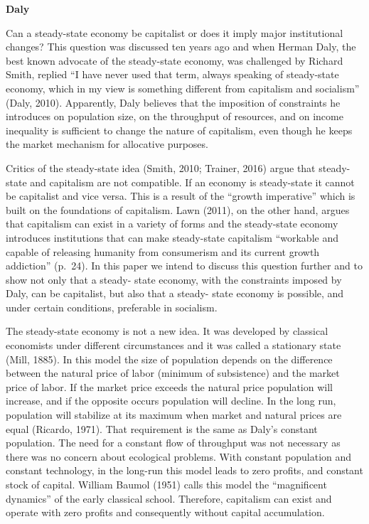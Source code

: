 \documentclass[
]{book}
\begin{document}
\textbf{Daly}

Can a steady-state economy be capitalist
or does it imply major institutional changes? This question was discussed ten years ago and
when Herman Daly, the best known advocate of the steady-state economy, was challenged
by Richard Smith, replied ``I have never used that term, always speaking of steady-state
economy, which in my view is something different from capitalism and socialism'' (Daly,
2010). Apparently, Daly believes that the imposition of constraints he introduces on
population size, on the throughput of resources, and on income inequality is sufficient to change the nature of capitalism, even though he keeps the market mechanism for allocative purposes.

Critics of the steady-state idea (Smith, 2010; Trainer, 2016) argue that steady-state and
capitalism are not compatible. If an economy is steady-state it cannot be capitalist and vice
versa. This is a result of the ``growth imperative'' which is built on the foundations of
capitalism. Lawn (2011), on the other hand, argues that capitalism can exist in a variety of
forms and the steady-state economy introduces institutions that can make steady-state
capitalism ``workable and capable of releasing humanity from consumerism and its current
growth addiction'' (p.~24).
In this paper we intend to discuss this question further and to show not only that a steady-
state economy, with the constraints imposed by Daly, can be capitalist, but also that a steady-
state economy is possible, and under certain conditions, preferable in socialism.

The steady-state economy is not a new idea. It was developed by classical economists under
different circumstances and it was called a stationary state (Mill, 1885). In this model the size
of population depends on the difference between the natural price of labor (minimum of
subsistence) and the market price of labor. If the market price exceeds the natural price
population will increase, and if the opposite occurs population will decline. In the long run,
population will stabilize at its maximum when market and natural prices are equal (Ricardo,
1971). That requirement is the same as Daly's constant population. The need for a constant
flow of throughput was not necessary as there was no concern about ecological problems.
With constant population and constant technology, in the long-run this model leads to zero
profits, and constant stock of capital. William Baumol (1951) calls this model the ``magnificent
dynamics'' of the early classical school. Therefore, capitalism can exist and operate with zero
profits and consequently without capital accumulation.
\end{document}
